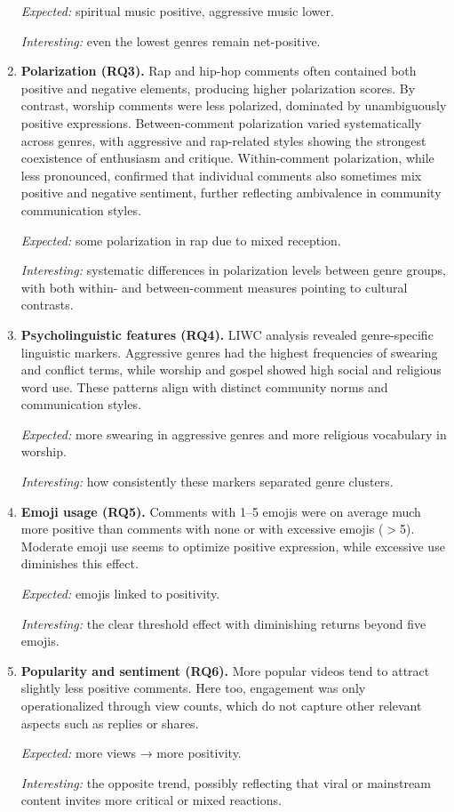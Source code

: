 \begin{enumerate}
\textit{Expected:} spiritual music positive, aggressive music lower.  

\textit{Interesting:} even the lowest genres remain net-positive.

\item \textbf{Polarization (RQ3).}  
Rap and hip-hop comments often contained both positive and negative elements, producing higher polarization scores.  
By contrast, worship comments were less polarized, dominated by unambiguously positive expressions.  
Between-comment polarization varied systematically across genres, with aggressive and rap-related styles showing the strongest coexistence of enthusiasm and critique.  
Within-comment polarization, while less pronounced, confirmed that individual comments also sometimes mix positive and negative sentiment, further reflecting ambivalence in community communication styles.  

\textit{Expected:} some polarization in rap due to mixed reception.  

\textit{Interesting:} systematic differences in polarization levels between genre groups, with both within- and between-comment measures pointing to cultural contrasts.

\item \textbf{Psycholinguistic features (RQ4).}  
LIWC analysis revealed genre-specific linguistic markers.  
Aggressive genres had the highest frequencies of swearing and conflict terms, while worship and gospel showed high social and religious word use.  
These patterns align with distinct community norms and communication styles.  

\textit{Expected:} more swearing in aggressive genres and more religious vocabulary in worship.

\textit{Interesting:} how consistently these markers separated genre clusters.

\item \textbf{Emoji usage (RQ5).}  
Comments with 1--5 emojis were on average much more positive than comments with none or with excessive emojis ($>$5).  
Moderate emoji use seems to optimize positive expression, while excessive use diminishes this effect.  

\textit{Expected:} emojis linked to positivity.  

\textit{Interesting:} the clear threshold effect with diminishing returns beyond five emojis.

\item \textbf{Popularity and sentiment (RQ6).}  
More popular videos tend to attract slightly less positive comments.  
Here too, engagement was only operationalized through view counts, which do not capture other relevant aspects such as replies or shares.  

\textit{Expected:} more views → more positivity.  

\textit{Interesting:} the opposite trend, possibly reflecting that viral or mainstream content invites more critical or mixed reactions.

\end{enumerate}

